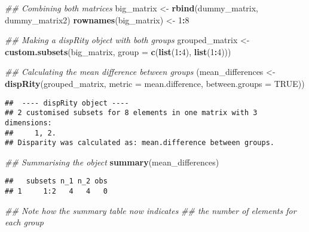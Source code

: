 \documentclass[
]{book}
\newenvironment{Shaded}{\begin{snugshade}}{\end{snugshade}}
\newcommand{\CommentTok}[1]{\textcolor[rgb]{0.56,0.35,0.01}{\textit{#1}}}
\newcommand{\DataTypeTok}[1]{\textcolor[rgb]{0.13,0.29,0.53}{#1}}
\newcommand{\DecValTok}[1]{\textcolor[rgb]{0.00,0.00,0.81}{#1}}
\newcommand{\KeywordTok}[1]{\textcolor[rgb]{0.13,0.29,0.53}{\textbf{#1}}}
\newcommand{\NormalTok}[1]{#1}
\newcommand{\OperatorTok}[1]{\textcolor[rgb]{0.81,0.36,0.00}{\textbf{#1}}}
\newcommand{\OtherTok}[1]{\textcolor[rgb]{0.56,0.35,0.01}{#1}}
\newcommand{\StringTok}[1]{\textcolor[rgb]{0.31,0.60,0.02}{#1}}
\begin{document}
\begin{Shaded}
\begin{Highlighting}[]
\CommentTok{\#\# Combining both matrices}
\NormalTok{big\_matrix \textless{}{-}}\StringTok{ }\KeywordTok{rbind}\NormalTok{(dummy\_matrix, dummy\_matrix2)}
\KeywordTok{rownames}\NormalTok{(big\_matrix) \textless{}{-}}\StringTok{ }\DecValTok{1}\OperatorTok{:}\DecValTok{8}

\CommentTok{\#\# Making a dispRity object with both groups}
\NormalTok{grouped\_matrix \textless{}{-}}\StringTok{ }\KeywordTok{custom.subsets}\NormalTok{(big\_matrix,}
                                 \DataTypeTok{group =} \KeywordTok{c}\NormalTok{(}\KeywordTok{list}\NormalTok{(}\DecValTok{1}\OperatorTok{:}\DecValTok{4}\NormalTok{), }\KeywordTok{list}\NormalTok{(}\DecValTok{1}\OperatorTok{:}\DecValTok{4}\NormalTok{)))}

\CommentTok{\#\# Calculating the mean difference between groups}
\NormalTok{(mean\_differences \textless{}{-}}\StringTok{ }\KeywordTok{dispRity}\NormalTok{(grouped\_matrix,}
                              \DataTypeTok{metric =}\NormalTok{ mean.difference,}
                              \DataTypeTok{between.groups =} \OtherTok{TRUE}\NormalTok{))}
\end{Highlighting}
\end{Shaded}

\begin{verbatim}
##  ---- dispRity object ---- 
## 2 customised subsets for 8 elements in one matrix with 3 dimensions:
##     1, 2.
## Disparity was calculated as: mean.difference between groups.
\end{verbatim}

\begin{Shaded}
\begin{Highlighting}[]
\CommentTok{\#\# Summarising the object}
\KeywordTok{summary}\NormalTok{(mean\_differences)}
\end{Highlighting}
\end{Shaded}

\begin{verbatim}
##   subsets n_1 n_2 obs
## 1     1:2   4   4   0
\end{verbatim}

\begin{Shaded}
\begin{Highlighting}[]
\CommentTok{\#\# Note how the summary table now indicates}
\CommentTok{\#\# the number of elements for each group}
\end{Highlighting}
\end{Shaded}
\end{document}

